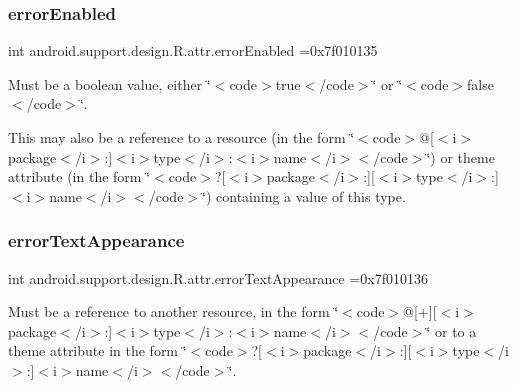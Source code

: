 \subsubsection{\texorpdfstring{error\+Enabled}{errorEnabled}}
{\footnotesize\ttfamily int android.\+support.\+design.\+R.\+attr.\+error\+Enabled =0x7f010135\hspace{0.3cm}{\ttfamily [static]}}

Must be a boolean value, either \char`\"{}$<$code$>$true$<$/code$>$\char`\"{} or \char`\"{}$<$code$>$false$<$/code$>$\char`\"{}. 

This may also be a reference to a resource (in the form \char`\"{}$<$code$>$@\mbox{[}$<$i$>$package$<$/i$>$\+:\mbox{]}$<$i$>$type$<$/i$>$\+:$<$i$>$name$<$/i$>$$<$/code$>$\char`\"{}) or theme attribute (in the form \char`\"{}$<$code$>$?\mbox{[}$<$i$>$package$<$/i$>$\+:\mbox{]}\mbox{[}$<$i$>$type$<$/i$>$\+:\mbox{]}$<$i$>$name$<$/i$>$$<$/code$>$\char`\"{}) containing a value of this type. \mbox{\label{classandroid_1_1support_1_1design_1_1R_1_1attr_a605392532b4693396b9e2760d4cb8368}} 
\subsubsection{\texorpdfstring{error\+Text\+Appearance}{errorTextAppearance}}
{\footnotesize\ttfamily int android.\+support.\+design.\+R.\+attr.\+error\+Text\+Appearance =0x7f010136\hspace{0.3cm}{\ttfamily [static]}}

Must be a reference to another resource, in the form \char`\"{}$<$code$>$@\mbox{[}+\mbox{]}\mbox{[}$<$i$>$package$<$/i$>$\+:\mbox{]}$<$i$>$type$<$/i$>$\+:$<$i$>$name$<$/i$>$$<$/code$>$\char`\"{} or to a theme attribute in the form \char`\"{}$<$code$>$?\mbox{[}$<$i$>$package$<$/i$>$\+:\mbox{]}\mbox{[}$<$i$>$type$<$/i$>$\+:\mbox{]}$<$i$>$name$<$/i$>$$<$/code$>$\char`\"{}. \mbox{\label{classandroid_1_1support_1_1design_1_1R_1_1attr_a61a0824e68ce23d2cb1bea33aeaf44f7}} 
